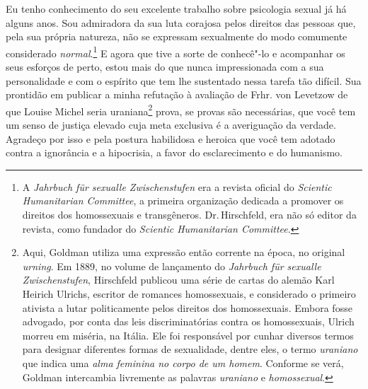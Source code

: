 \noindent Eu tenho conhecimento do seu excelente trabalho sobre psicologia sexual
já há alguns anos. Sou admiradora da sua luta corajosa pelos direitos
das pessoas que, pela sua própria natureza, não se expressam sexualmente
do modo comumente considerado \textit{normal}.\footnote{A \textit{Jahrbuch für
  sexualle Zwischenstufen} era a revista oficial do \textit{Scientic
  Humanitarian Committee}, a primeira organização dedicada a promover os
  direitos dos homossexuais e transgêneros. Dr.\,Hirschfeld, era não só
  editor da revista, como fundador do \textit{Scientic Humanitarian
  Committee}.} E agora que tive a sorte de conhecê"-lo e acompanhar os
seus esforços de perto, estou mais do que nunca impressionada com a sua
personalidade e com o espírito que tem lhe sustentado nessa tarefa tão
difícil. Sua prontidão em publicar a minha refutação à avaliação de
Frhr. von Levetzow de que Louise Michel seria uraniana\footnote{Aqui,
  Goldman utiliza uma expressão então corrente na época, no original
  \textit{urning}. Em 1889, no volume de lançamento do \textit{Jahrbuch
  für sexualle Zwischenstufen}, Hirschfeld publicou uma série de cartas
  do alemão Karl Heirich Ulrichs, escritor de romances homossexuais, e
  considerado o primeiro ativista a lutar politicamente pelos direitos
  dos homossexuais. Embora fosse advogado, por conta das leis
  discriminatórias contra os homossexuais, Ulrich morreu em miséria, na
  Itália. Ele foi responsável por cunhar diversos termos para designar
  diferentes formas de sexualidade, dentre eles, o termo \textit{uraniano}
  que indica uma \textit{alma feminina no corpo de um homem}. Conforme se
  verá, Goldman intercambia livremente as palavras \textit{uraniano} e
  \textit{homossexual}.} prova, se provas são necessárias, que você tem um
senso de justiça elevado cuja meta exclusiva é a averiguação da verdade.
Agradeço por isso e pela postura habilidosa e heroica que você tem
adotado contra a ignorância e a hipocrisia, a favor do esclarecimento e
do humanismo.

